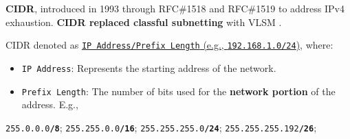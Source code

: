 \begin{Def}

    \textbf{CIDR}, introduced in 1993 through RFC\#1518 and RFC\#1519 to address IPv4 exhaustion.
    \textbf{CIDR replaced classful subnetting} with VLSM \cite{fuller_cidr_rfc1519}.

    \noindent
    CIDR denoted as \underline{\texttt{IP Address/Prefix Length} (e.g., \texttt{192.168.1.0/24})}, where:
    \begin{itemize}
        \item \texttt{IP Address}: Represents the starting address of the network.
        \item \texttt{Prefix Length}: The number of bits used for the \textbf{network portion} of the address. E.g.,
    \end{itemize}

        \vspace{-1em}
        \begin{center}
            \large
            \texttt{255.0.0.0\textbf{/8}}; \hspace{.2em} \texttt{255.255.0.0\textbf{/16}}; \hspace{.2em} \texttt{255.255.255.0\textbf{/24}}; \hspace{.2em} \texttt{255.255.255.192\textbf{/26}};
            \normalsize
        \end{center}
\end{Def}

